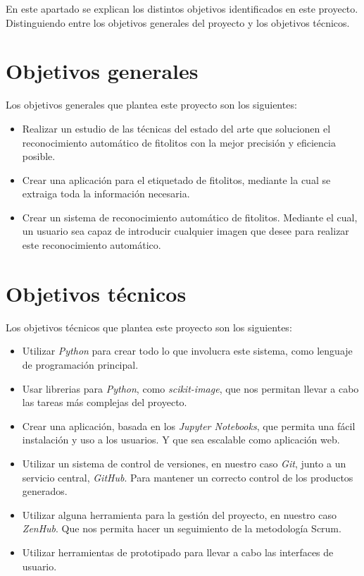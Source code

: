 

En este apartado se explican los distintos objetivos identificados en este proyecto. Distinguiendo entre los objetivos generales del proyecto y los objetivos técnicos.

\section{Objetivos generales}

Los objetivos generales que plantea este proyecto son los siguientes:

\begin{itemize}
	\item Realizar un estudio de las técnicas del estado del arte que solucionen el reconocimiento automático de fitolitos con la mejor precisión y eficiencia posible.
	\item Crear una aplicación para el etiquetado de fitolitos, mediante la cual se extraiga toda la información necesaria.
	\item Crear un sistema de reconocimiento automático de fitolitos. Mediante el cual, un usuario sea capaz de introducir cualquier imagen que desee para realizar este reconocimiento automático.
\end{itemize}

\section{Objetivos técnicos}

Los objetivos técnicos que plantea este proyecto son los siguientes:

\begin{itemize}
	\item Utilizar \textit{Python} para crear todo lo que involucra este sistema, como lenguaje de programación principal.
	\item Usar librerias para \textit{Python}, como \textit{scikit-image}\cite{scikit-image}, que nos permitan llevar a cabo las tareas más complejas del proyecto.
	\item Crear una aplicación, basada en los \textit{Jupyter Notebooks}, que permita una fácil instalación y uso a los usuarios. Y que sea escalable como aplicación web.
	\item Utilizar un sistema de control de versiones, en nuestro caso \textit{Git}, junto a un servicio central, \textit{GitHub}. Para mantener un correcto control de los productos generados.
	\item Utilizar alguna herramienta para la gestión del proyecto, en nuestro caso \textit{ZenHub}. Que nos permita hacer un seguimiento de la metodología Scrum.
	\item Utilizar herramientas de prototipado para llevar a cabo las interfaces de usuario.
\end{itemize}

